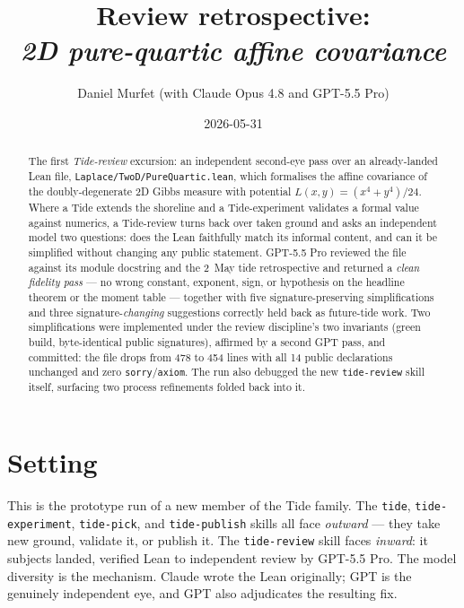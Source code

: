 \documentclass[11pt]{article}
\title{Review retrospective:\\\emph{2D pure-quartic affine covariance}}
\author{Daniel Murfet (with Claude Opus 4.8 and GPT-5.5 Pro)}
\date{2026-05-31}
\begin{document}
\maketitle

\begin{abstract}
The first \emph{Tide-review} excursion: an independent second-eye pass over an
already-landed Lean file, \texttt{Laplace/TwoD/PureQuartic.lean}, which formalises
the affine covariance of the doubly-degenerate 2D Gibbs measure with potential
$L(x,y)=(x^4+y^4)/24$. Where a Tide extends the shoreline and a Tide-experiment
validates a formal value against numerics, a Tide-review turns back over taken
ground and asks an independent model two questions: does the Lean faithfully match
its informal content, and can it be simplified without changing any public
statement. GPT-5.5 Pro reviewed the file against its module docstring and the
2~May tide retrospective and returned a \emph{clean fidelity pass} --- no wrong
constant, exponent, sign, or hypothesis on the headline theorem or the moment
table --- together with five signature-preserving simplifications and three
signature-\emph{changing} suggestions correctly held back as future-tide work. Two
simplifications were implemented under the review discipline's two invariants
(green build, byte-identical public signatures), affirmed by a second GPT pass,
and committed: the file drops from 478 to 454 lines with all 14 public
declarations unchanged and zero \texttt{sorry}/\texttt{axiom}. The run also
debugged the new \texttt{tide-review} skill itself, surfacing two process
refinements folded back into it.
\end{abstract}

\section{Setting}

This is the prototype run of a new member of the Tide family. The \texttt{tide},
\texttt{tide-experiment}, \texttt{tide-pick}, and \texttt{tide-publish} skills all
face \emph{outward} --- they take new ground, validate it, or publish it. The
\texttt{tide-review} skill faces \emph{inward}: it subjects landed, verified Lean
to independent review by GPT-5.5 Pro. The model diversity is the mechanism. Claude
wrote the Lean originally; GPT is the genuinely independent eye, and GPT also
adjudicates the resulting fix.
\end{document}
